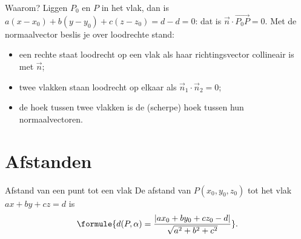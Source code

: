 Waarom? Liggen $P_0$ en $P$ in het vlak, dan is $a(x - x_0) + b(y - y_0) + c(z - z_0) = d - d = 0$: dat is $\vec n \cdot \overrightarrow{P_0P} = 0$. Met de normaalvector beslis je over loodrechte stand:
\begin{itemize}
\item een rechte staat loodrecht op een vlak als haar richtingsvector collineair is met $\vec n$;
\item twee vlakken staan loodrecht op elkaar als $\vec n_1 \cdot \vec n_2 = 0$;
\item de hoek tussen twee vlakken is de (scherpe) hoek tussen hun normaalvectoren.
\end{itemize}


\begin{oefeningen}
\end{oefeningen}


\begin{oefeningen}

\end{oefeningen}

\section{Afstanden}

\begin{theorie}
\begin{stelling}{Afstand van een punt tot een vlak}
De afstand van $P(x_0, y_0, z_0)$ tot het vlak $ax + by + cz = d$ is
\[\formule{d(P, \alpha) = \frac{|ax_0 + by_0 + cz_0 - d|}{\sqrt{a^2 + b^2 + c^2}}}.\]
\end{stelling}
\end{theorie}

